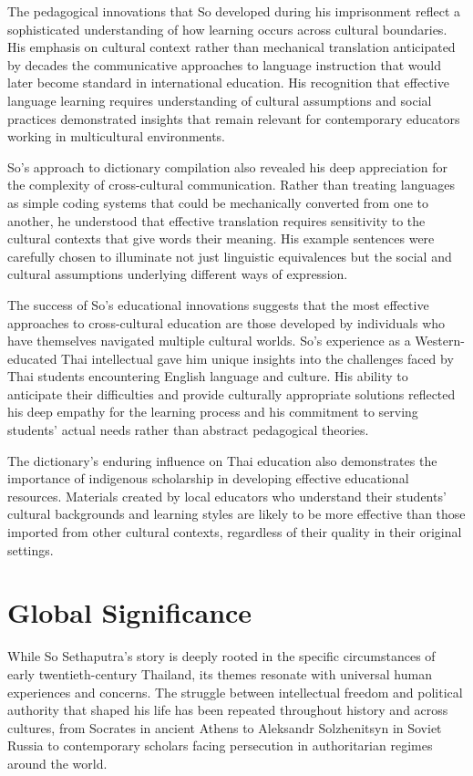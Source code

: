 \documentclass[
  Letterpaper,
]{scrbook}
\begin{document}
The pedagogical innovations that So developed during his imprisonment
reflect a sophisticated understanding of how learning occurs across
cultural boundaries. His emphasis on cultural context rather than
mechanical translation anticipated by decades the communicative
approaches to language instruction that would later become standard in
international education. His recognition that effective language
learning requires understanding of cultural assumptions and social
practices demonstrated insights that remain relevant for contemporary
educators working in multicultural environments.

So's approach to dictionary compilation also revealed his deep
appreciation for the complexity of cross-cultural communication. Rather
than treating languages as simple coding systems that could be
mechanically converted from one to another, he understood that effective
translation requires sensitivity to the cultural contexts that give
words their meaning. His example sentences were carefully chosen to
illuminate not just linguistic equivalences but the social and cultural
assumptions underlying different ways of expression.

The success of So's educational innovations suggests that the most
effective approaches to cross-cultural education are those developed by
individuals who have themselves navigated multiple cultural worlds. So's
experience as a Western-educated Thai intellectual gave him unique
insights into the challenges faced by Thai students encountering English
language and culture. His ability to anticipate their difficulties and
provide culturally appropriate solutions reflected his deep empathy for
the learning process and his commitment to serving students' actual
needs rather than abstract pedagogical theories.

The dictionary's enduring influence on Thai education also demonstrates
the importance of indigenous scholarship in developing effective
educational resources. Materials created by local educators who
understand their students' cultural backgrounds and learning styles are
likely to be more effective than those imported from other cultural
contexts, regardless of their quality in their original settings.

\section{Global Significance}\label{global-significance}

While So Sethaputra's story is deeply rooted in the specific
circumstances of early twentieth-century Thailand, its themes resonate
with universal human experiences and concerns. The struggle between
intellectual freedom and political authority that shaped his life has
been repeated throughout history and across cultures, from Socrates in
ancient Athens to Aleksandr Solzhenitsyn in Soviet Russia to
contemporary scholars facing persecution in authoritarian regimes around
the world.
\end{document}
